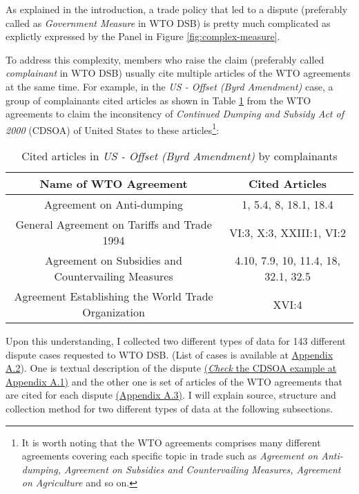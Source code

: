 As explained in the introduction,
a trade policy that led to a dispute (preferably called as \textit{Government Measure} in WTO DSB) is pretty much complicated as explictly expressed by the Panel in Figure \ref{fig:complex-measure}.

To address this complexity,
members who raise the claim (preferably called \textit{complainant} in WTO DSB) usually cite multiple articles of the WTO agreements at the same time. For example, in the
\textit{US - Offset (Byrd Amendment)} case,
a group of complainants
cited articles as shown in Table \ref{xltabular:cited-article-for-us-offset} from the WTO agreements to claim the inconsitency of \textit{Continued Dumping and Subsidy Act of 2000} (CDSOA) of United States to these articles\footnote{It is worth noting that the WTO agreements comprises many different agreements covering each specific topic in trade such as \textit{Agreement on Anti-dumping, Agreement on Subsidies and Countervailing Measures, Agreement on Agriculture} and so on.}:
\\
\begin{table}[h]
    \setlength\tabcolsep{15pt}
    \begin{tabular}{ c | c }
        \hline
        \textbf{\normalsize Name of WTO Agreement}          & \textbf{\normalsize Cited Articles} \\
        \hline \hline
        Agreement on Anti-dumping                           & 1, 5.4, 8, 18.1, 18.4               \\ \hline
        General Agreement on Tariffs and Trade 1994         & VI:3, X:3, XXIII:1, VI:2            \\ \hline
        Agreement on Subsidies and Countervailing Measures  & 4.10, 7.9, 10, 11.4, 18, 32.1, 32.5 \\ \hline
        Agreement Establishing the World Trade Organization & XVI:4                               \\ \hline
    \end{tabular}
    \caption{Cited articles in \textit{US - Offset (Byrd Amendment)} by complainants}
    \label{xltabular:cited-article-for-us-offset}
\end{table}

\noindent Upon this understanding,
I collected two different types of data for 143 different dispute cases requested to WTO DSB. (List of cases is
available at \hyperref[sub:cited-articles-table]{Appendix A.2}).
One is textual description of the dispute \hyperref[sub:factual-aspect-example]{(\textit{Check} the CDSOA example at Appendix A.1)} and the other one is
set of articles of the WTO agreements that are
cited for each dispute \hyperref[sub:cited-articles-table]{(Appendix A.3)}.
I will explain source, structure and collection method for two different types of data at the following subsections.\\


